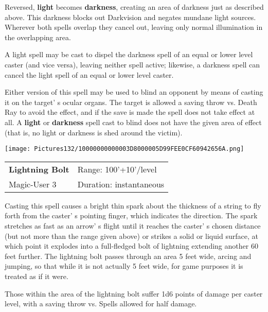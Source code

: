 \documentclass[a4paper,twoside,openany,10pt]{book}
\begin{document}
\begin{multicols}{2}
Reversed, \textbf{light} becomes \textbf{darkness}, creating an area of darkness just as described above. This darkness blocks out Darkvision and negates mundane light sources. Wherever both spells overlap they cancel out, leaving only normal illumination in the overlapping area. 

A light spell may be cast to dispel the darkness spell of an equal or lower level caster (and vice versa), leaving neither spell active; likewise, a darkness spell can cancel the light spell of an equal or lower level caster.

Either version of this spell may be used to blind an opponent by means of casting it on the target' s ocular organs. The target is allowed a saving throw vs. Death Ray to avoid the effect, and if the save is made the spell does not take effect at all. A \textbf{light} or \textbf{darkness} spell cast to blind does not have the given area of effect (that is, no light or darkness is shed around the victim).

\medskip

\begin{flushleft}
\texttt{[image: Pictures132/10000000000003D8000005D99FEE0CF60942656A.png]}
\end{flushleft}

\smallskip\begin{flushleft} 
	\begin{tabularx}{0.45\textwidth}{@{}m{3.5cm}m{5.5cm}@{}} 
		\textbf{Lightning Bolt} & Range: 100'+10'/level\\
Magic-User 3 &Duration: instantaneous\\
	\end{tabularx}\end{flushleft}

Casting this spell causes a bright thin spark about the thickness of a string to fly forth from the caster' s pointing finger, which indicates the direction. The spark stretches as fast as an arrow' s flight until it reaches the caster' s chosen distance (but not more than the range given above) or strikes a solid or liquid surface, at which point it explodes into a full-fledged bolt of lightning extending another 60 feet further. The lightning bolt passes through an area 5 feet wide, arcing and jumping, so that while it is not actually 5 feet wide, for game purposes it is treated as if it were.

Those within the area of the lightning bolt suffer 1d6 points of damage per caster level, with a saving throw vs. Spells allowed for half damage.


\end{multicols}
\end{document}
